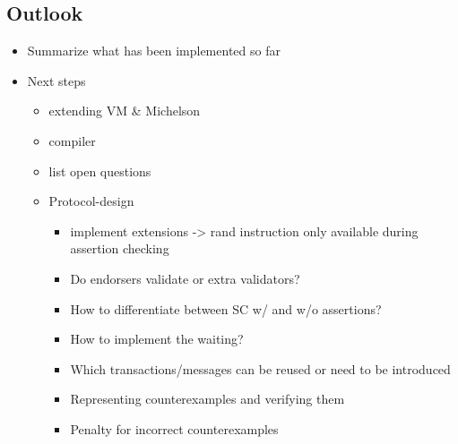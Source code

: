 
\subsection{Outlook}

\draft{}
\begin{itemize}
\item Summarize what has been implemented so far
\item Next steps
	\begin{itemize}
	\item extending VM \& Michelson
	\item compiler
	\item list open questions
	\item Protocol-design
		\begin{itemize}
		\item implement extensions -> rand instruction only available during assertion checking
		\item Do endorsers validate or extra validators?
		\item How to differentiate between SC w/ and w/o assertions?
		\item How to implement the waiting?
		\item Which transactions/messages can be reused or need to be introduced
		\item Representing counterexamples and verifying them
		\item Penalty for incorrect counterexamples
		\end{itemize}
	\end{itemize}
\end{itemize}